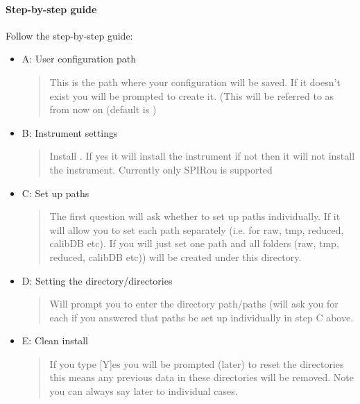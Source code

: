 \documentclass[a4paper,10pt,english]{report}
\begin{document}
\paragraph{Step-by-step guide}
\label{\detokenize{user/general/installation:step-by-step-guide}}
Follow the step-by-step guide:
\begin{itemize}
\item {} 
A: User configuration path
\begin{quote}

This is the path where your configuration will be saved. If it doesn’t exist you will be prompted to create it. (This will be referred to as {\hyperref[\detokenize{misc/glossary:term-drs-uconfig}]{}}
from now on (default is )
\end{quote}

\item {} 
B: Instrument settings
\begin{quote}

Install {\hyperref[\detokenize{misc/glossary:term-instrument}]{}}.
If yes it will install the instrument if not then it will not install the instrument. Currently only SPIRou is supported
\end{quote}

\item {} 
C: Set up paths
\begin{quote}

The first question will ask  whether to set up paths individually. If 
it will allow you to set each path separately (i.e. for raw, tmp, reduced, calibDB etc). If 
you will just set one path and all folders (raw, tmp, reduced, calibDB etc)) will be created under this directory.
\end{quote}

\item {} 
D: Setting the directory/directories
\begin{quote}

Will prompt you to enter the directory path/paths (will ask you for each if you answered that paths be set up individually in step C above.
\end{quote}

\item {} 
E: Clean install
\begin{quote}

If you type {[}Y{]}es you will be prompted (later) to reset the directories this means any previous data in these directories will be removed. Note you can always say later to individual cases.
\end{quote}

\end{itemize}
\end{document}
